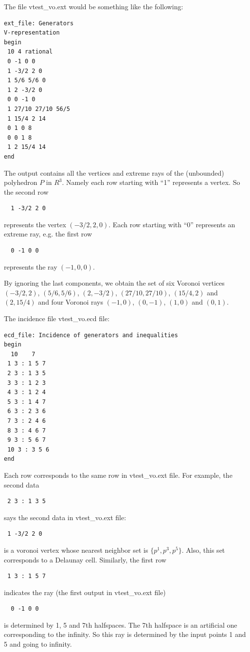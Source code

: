 \documentclass[a4paper,12pt]{article}
\newcommand{\HBrule}{\noindent \hrulefill \medskip}
\newcommand{\HTrule}{\medskip \noindent \hrulefill}
\begin{document}
\begin{small}
The file vtest\_vo.ext would be something like the following:

\HTrule
\begin{verbatim}
ext_file: Generators
V-representation
begin
 10 4 rational
 0 -1 0 0
 1 -3/2 2 0
 1 5/6 5/6 0
 1 2 -3/2 0
 0 0 -1 0
 1 27/10 27/10 56/5
 1 15/4 2 14
 0 1 0 8
 0 0 1 8
 1 2 15/4 14
end
\end{verbatim}
\HBrule

The output contains all the vertices
and extreme rays of the (unbounded) polyhedron $P$ in $R^3$.
Namely each row starting with ``1'' represents a vertex.
So the second row 
\begin{verbatim}  1 -3/2 2 0\end{verbatim}
represents the vertex $(-3/2, 2, 0)$.  Each row starting
with ``0'' represents an extreme ray, e.g. the first row
\begin{verbatim}  0 -1 0 0 \end{verbatim}
represents the ray  $(-1, 0, 0)$.

By ignoring the last components, we obtain the set of six
Voronoi vertices $(-3/2, 2)$, $(5/6, 5/6)$, $(2, -3/2)$, $(27/10, 27/10)$,
$(15/4, 2)$ and $(2, 15/4)$ and four Voronoi rays
$(-1, 0)$, $(0, -1)$, $(1, 0)$ and $(0, 1)$.

The incidence file vtest\_vo.ecd file:

\HTrule
\begin{verbatim}
ecd_file: Incidence of generators and inequalities
begin
  10    7
 1 3 : 1 5 7 
 2 3 : 1 3 5 
 3 3 : 1 2 3 
 4 3 : 1 2 4 
 5 3 : 1 4 7 
 6 3 : 2 3 6 
 7 3 : 2 4 6 
 8 3 : 4 6 7 
 9 3 : 5 6 7 
 10 3 : 3 5 6 
end
\end{verbatim}
\HBrule

Each row corresponds to the same row in vtest\_vo.ext file.
For example, the second data 
\begin{verbatim} 2 3 : 1 3 5\end{verbatim}
says the second data in vtest\_vo.ext file:
\begin{verbatim} 1 -3/2 2 0  
\end{verbatim}
is a voronoi vertex whose nearest neighbor set
is $\{p^1, p^3, p^5\}$.  Also, this set corresponds
to a Delaunay cell.
Similarly, the first row
\begin{verbatim} 1 3 : 1 5 7\end{verbatim}
indicates the ray (the first output in vtest\_vo.ext file)
\begin{verbatim}  0 -1 0 0 \end{verbatim}
is determined by 1, 5 and 7th halfspaces.  The 7th halfspace
is an artificial one corresponding to the infinity.  So this ray
is determined by the input points 1 and 5 and going to infinity.


\end{small}
\end{document}
